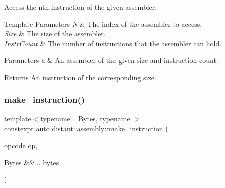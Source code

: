 Access the nth instruction of the given assembler. 


\begin{DoxyTemplParams}{Template Parameters}
{\em N} & The index of the assembler to access. ~\newline
\\
\hline
{\em Size} & The size of the assembler. \\
\hline
{\em Instr\+Count} & The number of instructions that the assembler can hold. \\
\hline
\end{DoxyTemplParams}

\begin{DoxyParams}{Parameters}
{\em a} & An assembler of the given size and instruction count.\\
\hline
\end{DoxyParams}
\begin{DoxyReturn}{Returns}
An instruction of the corresponding size. 
\end{DoxyReturn}
\mbox{\label{namespacedistant_1_1assembly_a1e6310ecc2d9bbb403adb7bd8b933c09}} 
\subsubsection{\texorpdfstring{make\+\_\+instruction()}{make\_instruction()}\hspace{0.1cm}{\footnotesize\ttfamily [1/2]}}
{\footnotesize\ttfamily template$<$typename... Bytes, typename $>$ \\
constexpr auto distant\+::assembly\+::make\+\_\+instruction (\begin{DoxyParamCaption}\item[{\mbox{\hyperlink{namespacedistant_1_1assembly_a64d7b047d9e3df1ac04919f7c4f8f6fa}{opcode}}}]{op,  }\item[{Bytes \&\&...}]{bytes }\end{DoxyParamCaption})\hspace{0.3cm}{\ttfamily [noexcept]}}

\mbox{\label{namespacedistant_1_1assembly_a9c99faffef3ae358ebb79a499415f770}} 
